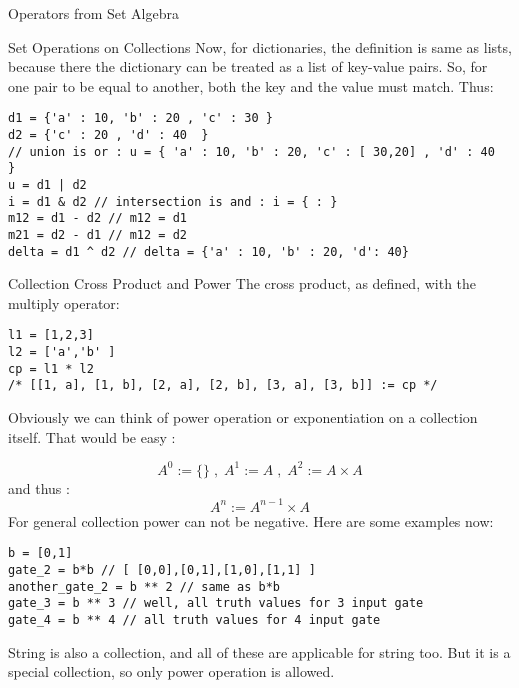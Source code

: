 \begin{section}{Operators from Set Algebra}
\begin{subsection}{Set Operations on Collections}
Now, for dictionaries, the definition is same as lists, 
because there the dictionary can be treated as a list of key-value pairs.
So, for one pair to be equal to another, both the key and the value must match.
Thus:

\begin{center}\begin{minipage}{\linewidth}
\begin{lstlisting}[style=JexlStyle]
d1 = {'a' : 10, 'b' : 20 , 'c' : 30 }
d2 = {'c' : 20 , 'd' : 40  }
// union is or : u = { 'a' : 10, 'b' : 20, 'c' : [ 30,20] , 'd' : 40  }
u = d1 | d2 
i = d1 & d2 // intersection is and : i = { : } 
m12 = d1 - d2 // m12 = d1 
m21 = d2 - d1 // m12 = d2
delta = d1 ^ d2 // delta = {'a' : 10, 'b' : 20, 'd': 40}
\end{lstlisting}
\end{minipage}\end{center}

\end{subsection}

\begin{subsection}{Collection Cross Product and Power}
The cross product, as defined, with the multiply operator:

\begin{center}\begin{minipage}{\linewidth}
\begin{lstlisting}[style=JexlStyle]
l1 = [1,2,3]
l2 = ['a','b' ]
cp = l1 * l2 
/* [[1, a], [1, b], [2, a], [2, b], [3, a], [3, b]] := cp */
\end{lstlisting}
\end{minipage}\end{center}

Obviously we can think of power operation or exponentiation 
on a collection itself. That would be easy :

$$
A^0 := \{\} \; , \; A^1 := A \; , \; A^2 := A \times A
$$
and thus :
$$
A^n :=  A^{n-1} \times A
$$
For general collection power can not be negative.
Here are some examples now:

\begin{lstlisting}[style=JexlStyle]
b = [0,1]
gate_2 = b*b // [ [0,0],[0,1],[1,0],[1,1] ]
another_gate_2 = b ** 2 // same as b*b 
gate_3 = b ** 3 // well, all truth values for 3 input gate 
gate_4 = b ** 4 // all truth values for 4 input gate 
\end{lstlisting}

String is also a collection, and all of these are applicable for string too.
But it is a special collection, so only power operation is allowed.


\end{subsection}
\end{section}

